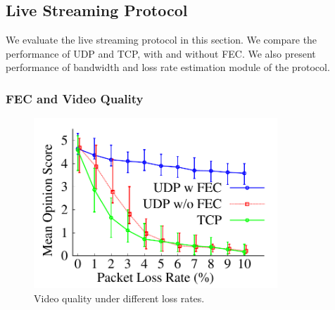 \subsection{Live Streaming Protocol}

We evaluate the live streaming protocol in this section. 
We compare the performance of UDP and TCP, with and without
FEC. 
We also present performance of bandwidth and loss rate
estimation module of the protocol. 

\subsubsection{FEC and Video Quality}

\begin{figure}[ht]
\centering
\vspace{-0.3cm}
\includegraphics[width=3.6in,angle=0]{Figs/RTDrive/evaluation/video_quality_errorbars.pdf}
\vspace{-0.3cm}
\caption{Video quality under different loss rates.}
\vspace{-0.2cm}
\label{loss_quality}
\centering
\end{figure}



